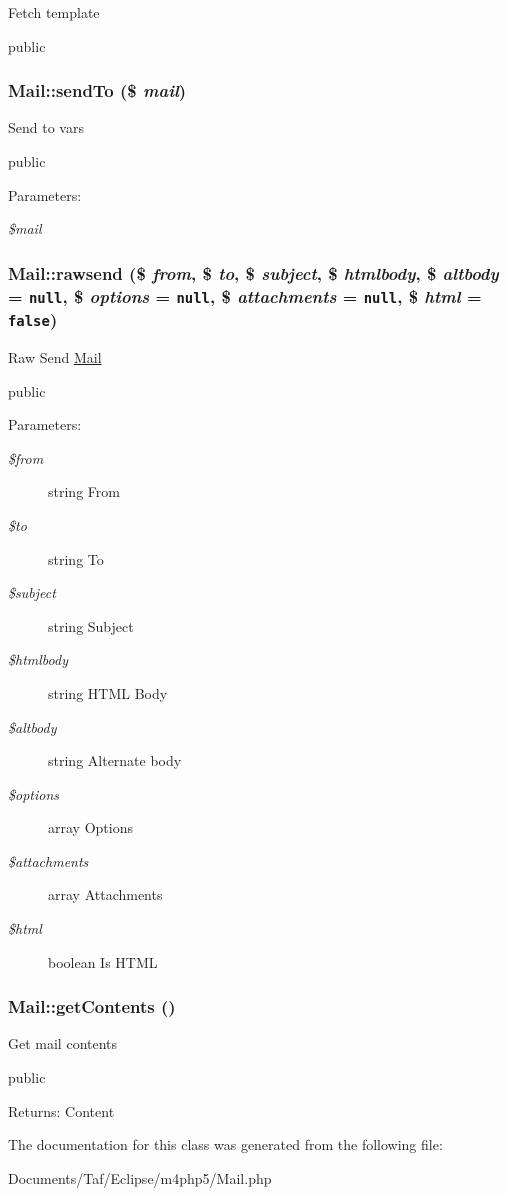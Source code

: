 Fetch template

public \hypertarget{classMail_1a876548e9e9a29126959597a21e7c4a}{
\subsubsection[sendTo]{\setlength{\rightskip}{0pt plus 5cm}Mail::sendTo (\$ {\em mail})}}
\label{classMail_1a876548e9e9a29126959597a21e7c4a}


Send to vars

public \begin{Desc}
\item[Parameters:]
\begin{description}
\item[{\em \$mail}]\end{description}
\end{Desc}
\hypertarget{classMail_7cc8cfd426c352b3f61d0c792551481f}{
\subsubsection[rawsend]{\setlength{\rightskip}{0pt plus 5cm}Mail::rawsend (\$ {\em from}, \/  \$ {\em to}, \/  \$ {\em subject}, \/  \$ {\em htmlbody}, \/  \$ {\em altbody} = {\tt null}, \/  \$ {\em options} = {\tt null}, \/  \$ {\em attachments} = {\tt null}, \/  \$ {\em html} = {\tt false})}}
\label{classMail_7cc8cfd426c352b3f61d0c792551481f}


Raw Send \hyperlink{classMail}{Mail}

public \begin{Desc}
\item[Parameters:]
\begin{description}
\item[{\em \$from}]string From \item[{\em \$to}]string To \item[{\em \$subject}]string Subject \item[{\em \$htmlbody}]string HTML Body \item[{\em \$altbody}]string Alternate body \item[{\em \$options}]array Options \item[{\em \$attachments}]array Attachments \item[{\em \$html}]boolean Is HTML \end{description}
\end{Desc}
\hypertarget{classMail_54871f85d58e55c51c7791b7770c9b53}{
\subsubsection[getContents]{\setlength{\rightskip}{0pt plus 5cm}Mail::getContents ()}}
\label{classMail_54871f85d58e55c51c7791b7770c9b53}


Get mail contents

public \begin{Desc}
\item[Returns:]Content \end{Desc}


The documentation for this class was generated from the following file:\begin{CompactItemize}
\item 
Documents/Taf/Eclipse/m4php5/Mail.php\end{CompactItemize}
